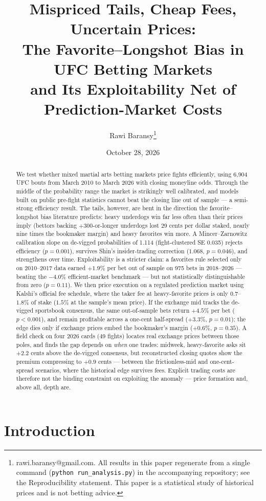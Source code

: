 \documentclass[11pt]{article}
\title{\textbf{Mispriced Tails, Cheap Fees, Uncertain Prices:\\
The Favorite--Longshot Bias in UFC Betting Markets\\
and Its Exploitability Net of Prediction-Market Costs}}
\author{Rawi Baransy\thanks{rawi.baransy@gmail.com. All results in this paper regenerate from a single
command (\texttt{python run\_analysis.py}) in the accompanying repository; see the Reproducibility
statement. This paper is a statistical study of historical prices and is not betting advice.}}
\date{October 28, 2026}
\newcommand{\devig}{de-vigged}
\begin{document}
\maketitle

\begin{abstract}
\noindent
We test whether mixed martial arts betting markets price fights efficiently, using 6{,}904 UFC bouts
from March 2010 to March 2026 with closing moneyline odds. Through the middle of the probability
range the market is strikingly well calibrated, and models built on public pre-fight statistics
cannot beat the closing line out of sample --- a semi-strong efficiency result. The tails, however,
are bent in the direction the favorite--longshot bias literature predicts: heavy underdogs win far
less often than their prices imply (bettors backing $+300$-or-longer underdogs lost 29 cents per
dollar staked, nearly nine times the bookmaker margin) and heavy favorites win more. A Mincer--Zarnowitz
calibration slope on \devig{} probabilities of 1.114 (fight-clustered SE 0.035) rejects efficiency
($p=0.001$), survives Shin's insider-trading correction ($1.068$, $p=0.046$), and strengthens over
time. Exploitability is a stricter claim: a favorites rule selected only on 2010--2017 data earned
$+1.9\%$ per bet out of sample on 975 bets in 2018--2026 --- beating the $-4.0\%$ efficient-market
benchmark --- but not statistically distinguishable from zero ($p=0.11$). We then price execution on
a regulated prediction market using Kalshi's official fee schedule, where the taker fee at
heavy-favorite prices is only $0.7$--$1.8\%$ of stake ($1.5\%$ at the sample's mean price). If the exchange mid tracks the \devig{}
sportsbook consensus, the same out-of-sample bets return $+4.5\%$ per bet ($p<0.001$), and remain
profitable across a one-cent half-spread ($+3.3\%$, $p=0.01$); the edge dies only if exchange prices
embed the bookmaker's margin ($+0.6\%$, $p=0.35$). A field check on four 2026 cards (49 fights)
locates real exchange prices between those poles, and finds the gap depends on \emph{when} one
trades: midweek, heavy-favorite asks sit $+2.2$ cents above the \devig{} consensus, but
reconstructed closing quotes show the premium compressing to $+0.9$ cents --- between the
frictionless-mid and one-cent-spread scenarios, where the historical edge survives fees. Explicit
trading costs are therefore not the binding constraint on exploiting the anomaly --- price
formation and, above all, depth are.
\end{abstract}

\section{Introduction}
\end{document}
